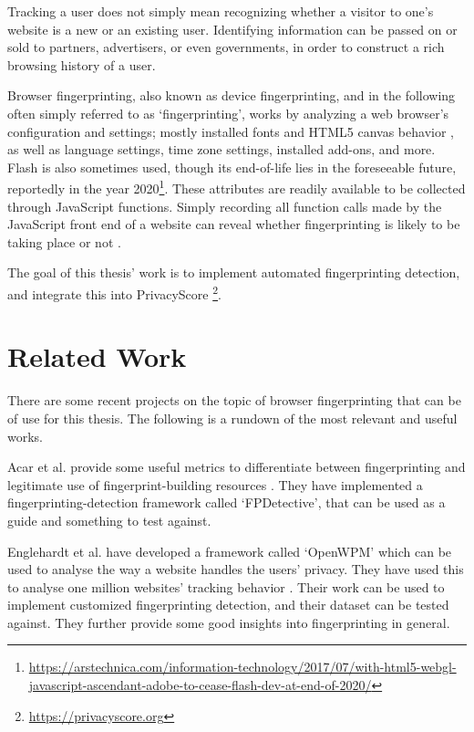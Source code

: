\documentclass[
    fontsize=12pt,
    headings=small,
    parskip=half,
    bibliography=totoc,
    numbers=noenddot,
    open=any
    ]{scrreprt}
\begin{document}
Tracking a user does not simply mean recognizing whether a visitor to one's website is a new or an existing user.
Identifying information can be passed on or sold to partners, advertisers, or even governments, in order to
construct a rich browsing history of a user.

Browser fingerprinting, also known as device fingerprinting, and in the following often simply referred to as `fingerprinting',
works by analyzing a web browser's configuration and settings; mostly installed fonts and HTML5 canvas behavior
\cite{DBLP:conf/ccs/EnglehardtN16}, as well as
language settings, time zone settings, installed add-ons, and more. Flash is also sometimes used, though
its end-of-life lies in the foreseeable future, reportedly in the year 2020\footnote{\url{https://arstechnica.com/information-technology/2017/07/with-html5-webgl-javascript-ascendant-adobe-to-cease-flash-dev-at-end-of-2020/}}.
These attributes are readily available to be collected through JavaScript functions. Simply recording
all function calls made by the JavaScript front end of a website can reveal whether fingerprinting is likely to
be taking place or not \cite{faiz2014browser}\cite{panopticlick}.

The goal of this thesis' work is to implement automated fingerprinting detection, and integrate this into
PrivacyScore \footnote{\url{https://privacyscore.org}}.


\begingroup
\renewcommand{\cleardoublepage}{}
\renewcommand{\clearpage}{}
\chapter{Related Work} %
\endgroup

There are some recent projects on the topic of browser fingerprinting that can be of use for this thesis.
The following is a rundown of the most relevant and useful works.

Acar et al. provide some useful metrics to differentiate between fingerprinting and legitimate use of
fingerprint-building resources \cite{DBLP:conf/ccs/AcarJNDGPP13}. They have implemented a fingerprinting-detection
framework called `FPDetective', that can be used as a guide and something to test against.

Englehardt et al. have developed a framework called `OpenWPM' which can be used to analyse the way a website
handles the users' privacy. They have used this to analyse one million websites' tracking behavior
\cite{DBLP:conf/ccs/EnglehardtN16}. Their work can be used to implement customized fingerprinting detection,
and their dataset can be tested against. They further provide some good insights into fingerprinting in general.
\end{document}
